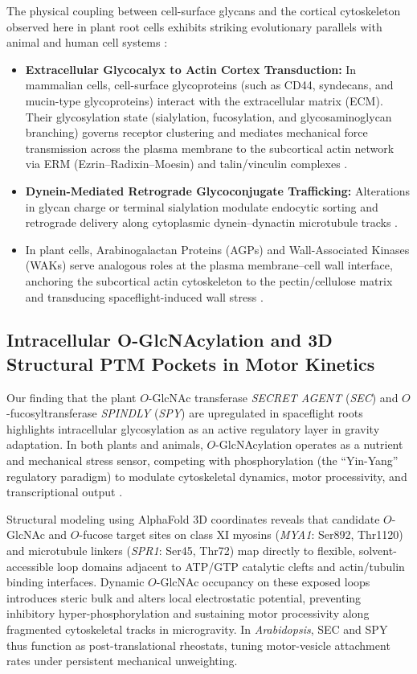 The physical coupling between cell-surface glycans and the cortical cytoskeleton observed here in plant root cells exhibits striking evolutionary parallels with animal and human cell systems \cite{Humphrey2014, Paszek2014}:
\begin{itemize}
    \item \textbf{Extracellular Glycocalyx to Actin Cortex Transduction:} In mammalian cells, cell-surface glycoproteins (such as CD44, syndecans, and mucin-type glycoproteins) interact with the extracellular matrix (ECM). Their glycosylation state (sialylation, fucosylation, and glycosaminoglycan branching) governs receptor clustering and mediates mechanical force transmission across the plasma membrane to the subcortical actin network via ERM (Ezrin--Radixin--Moesin) and talin/vinculin complexes \cite{Fehon2010, Critchley2004}.
    \item \textbf{Dynein-Mediated Retrograde Glycoconjugate Trafficking:} Alterations in glycan charge or terminal sialylation modulate endocytic sorting and retrograde delivery along cytoplasmic dynein--dynactin microtubule tracks \cite{Reck-Peterson2018}.
    \item In plant cells, Arabinogalactan Proteins (AGPs) and Wall-Associated Kinases (WAKs) serve analogous roles at the plasma membrane--cell wall interface, anchoring the subcortical actin cytoskeleton to the pectin/cellulose matrix and transducing spaceflight-induced wall stress \cite{Kohorn2016, Seifert2007}.
\end{itemize}

\subsection{Intracellular O-GlcNAcylation and 3D Structural PTM Pockets in Motor Kinetics}

Our finding that the plant $O$-GlcNAc transferase \textit{SECRET AGENT} (\textit{SEC}) and $O$-fucosyltransferase \textit{SPINDLY} (\textit{SPY}) are upregulated in spaceflight roots highlights intracellular glycosylation as an active regulatory layer in gravity adaptation. In both plants and animals, $O$-GlcNAcylation operates as a nutrient and mechanical stress sensor, competing with phosphorylation (the ``Yin-Yang'' regulatory paradigm) to modulate cytoskeletal dynamics, motor processivity, and transcriptional output \cite{Hart2011, Wells2002}.

Structural modeling using AlphaFold 3D coordinates reveals that candidate $O$-GlcNAc and $O$-fucose target sites on class XI myosins (\textit{MYA1}: Ser892, Thr1120) and microtubule linkers (\textit{SPR1}: Ser45, Thr72) map directly to flexible, solvent-accessible loop domains adjacent to ATP/GTP catalytic clefts and actin/tubulin binding interfaces. Dynamic $O$-GlcNAc occupancy on these exposed loops introduces steric bulk and alters local electrostatic potential, preventing inhibitory hyper-phosphorylation and sustaining motor processivity along fragmented cytoskeletal tracks in microgravity. In \textit{Arabidopsis}, SEC and SPY thus function as post-translational rheostats, tuning motor-vesicle attachment rates under persistent mechanical unweighting.


